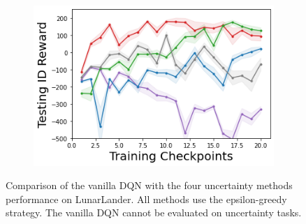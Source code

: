 \begin{figure}
\begin{subfigure}{.3\textwidth}
    \end{subfigure}
    \begin{subfigure}{.3\textwidth}
        \includegraphics[width=\textwidth]{sections/011_icml2022/resources/LunarLander-v2-mean_reward_-testing-model+.png}
    \end{subfigure}

        \caption{Comparison of the vanilla DQN with the four uncertainty methods performance on LunarLander. All methods use the epsilon-greedy strategy. The vanilla DQN cannot be evaluated on uncertainty tasks.}
    \label{fig:camprison-vanilla-lunarlander}
\end{figure}